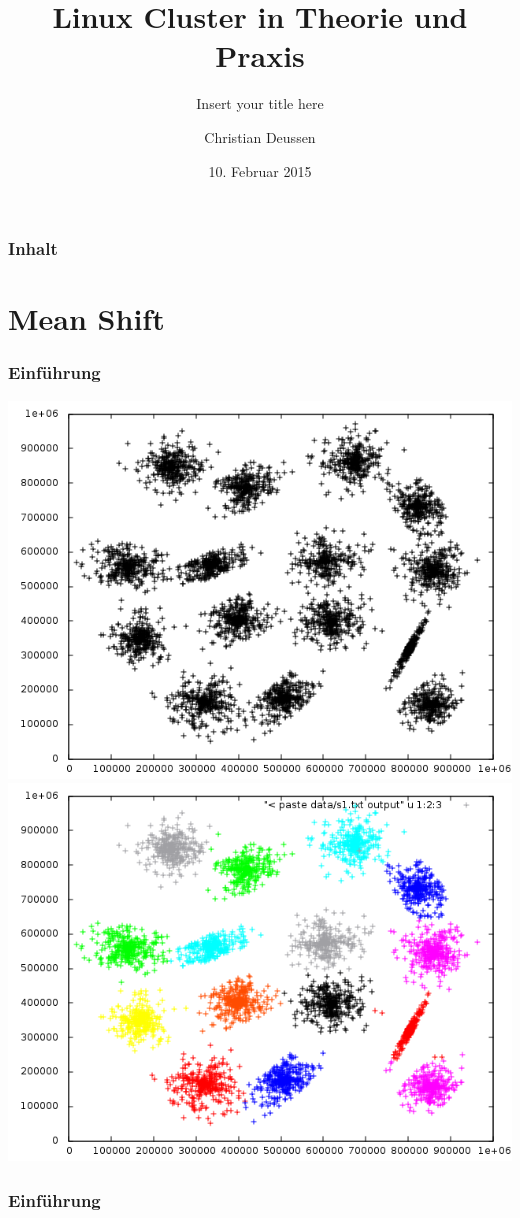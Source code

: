 \documentclass[10pt]{beamer}
\title{Linux Cluster in Theorie und Praxis}
\subtitle{Insert your title here}
\author{Christian Deussen}
\date{10. Februar 2015}
\institute[ZIH TUD]{Zentrum f\"ur Informationsdienste und Hochleistungsrechnen -- TU Dresden}
\begin{document}
\zihmaketitle

\begin{frame}
\frametitle{Inhalt}
 \tableofcontents
\end{frame}


\section{Mean Shift}
\begin{frame}
	\frametitle{Einf\"uhrung}
	\includegraphics[scale=0.34, keepaspectratio]{pics/s1_black.png}
	\includegraphics[scale=0.34, keepaspectratio]{pics/s1_colored.png}
\end{frame}
\begin{frame}
	\frametitle{Einf\"uhrung}
\end{frame}
\end{document}
